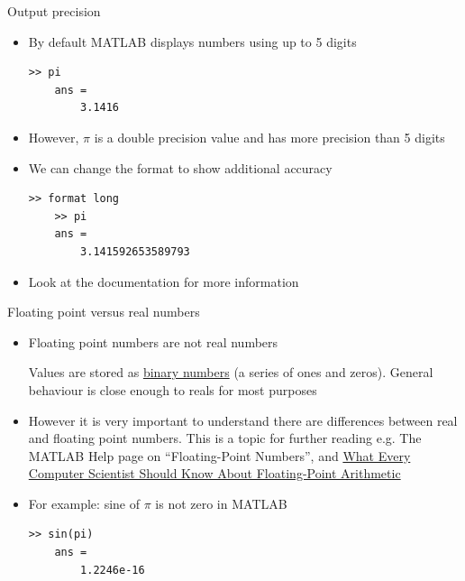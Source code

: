 \documentclass{beamer}
\begin{document}
\begin{frame}[fragile]{Output precision}
	\begin{itemize}
		\item By default MATLAB displays numbers using up to 5 digits
		
		\begin{lstlisting}[style=Matlab-editor]
	>> pi
	ans = 
		3.1416
		\end{lstlisting}
		\item However, $\pi$ is a double precision value and has more precision than 5 digits
		\item We can change the format to show additional accuracy
		\begin{lstlisting}[style=Matlab-editor]
	>> format long
	>> pi
	ans = 
		3.141592653589793
		\end{lstlisting}
		\item Look at the documentation for more information
	\end{itemize}
\end{frame}

\begin{frame}[fragile]{Floating point versus real numbers}
	\begin{itemize}
		\item Floating point numbers are not real numbers
		
		Values are stored as \href{https://www.mathsisfun.com/binary-number-system.html}{binary numbers} (a series of ones and zeros). 
		General behaviour is close enough to reals for most purposes
		\item However it is very important to understand there are differences between real and floating point numbers. This is a topic for further reading e.g.
		The MATLAB Help page on ``Floating-Point Numbers'', and \href{https://docs.oracle.com/cd/E19957-01/806-3568/ncg_goldberg.html}{What Every Computer Scientist Should Know About Floating-Point Arithmetic}
		\item  For example: sine of $\pi$ is not zero in MATLAB
		\begin{lstlisting}[style=Matlab-editor]
	>> sin(pi)
	ans = 
		1.2246e-16
		\end{lstlisting}
		
	\end{itemize}
\end{frame}
\end{document}

